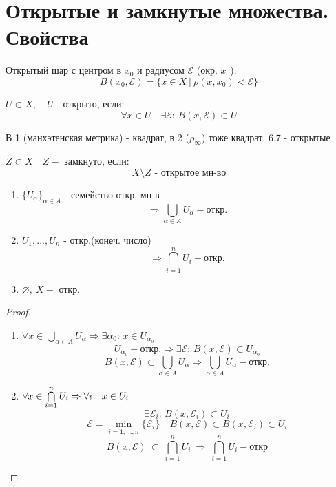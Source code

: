 \documentclass[geometry.tex]{subfiles}
\begin{document}
  \section{Открытые и замкнутые множества. Свойства}

  \begin{definition}
      Открытый шар с центром в $x_0$ и радиусом $\mathcal{E}$ (окр.  $x_0$):
      \[B(x_0, \mathcal{E}) = \{x \in X \ | \ \rho(x, x_0) < \mathcal{E}\}\]
  \end{definition}

  \begin{definition}
      $U \subset X, \quad U$ - открыто, если:
      \[\forall x \in U \quad \exists \mathcal{E}\text{: } B(x, \mathcal{E}) \subset U\]
  \end{definition}

  \begin{example}
      В 1 (манхэтенская метрика) - квадрат, в 2 ($\rho_{\infty}$) тоже квадрат, 6,7 - открытые
  \end{example}

  \begin{definition}
      $Z \subset X \quad Z -$ замкнуто, если:
      \[X \setminus Z \text{ - открытое мн-во}\]
  \end{definition}

  \begin{theorem}[св-ва откр. мн-в]
      \begin{enumerate}
          \item $\{ U_\alpha \}_{\alpha \in A}$ - семейство откр. мн-в
                 \[\Rightarrow \bigcup_{\alpha \in A}U_\alpha - \text{откр.}\]
          \item $U_1,...,U_n$ - откр.(конеч. число) \[\Rightarrow \bigcap_{i = 1}^n U_i - \text{откр.}\]
          \item $\varnothing,\ X - $ откр.
      \end{enumerate}
  \end{theorem}
  \begin{proof}
      \begin{enumerate}
          \item $\forall x \in \bigcup\limits_{\alpha \in A} U_\alpha \Rightarrow \exists \alpha_0\text{: } x \in U_{\alpha_0}$
                 \[U_{\alpha_0} - \text{откр.}\Rightarrow \exists \mathcal{E}\text{: } B(x, \mathcal{E}) \subset U_{\alpha_0}\]
                 \[B(x, \mathcal{E}) \subset \bigcup_{\alpha \in A} U_\alpha \Rightarrow
                 \bigcup_{\alpha \in A} U_\alpha - \text{откр.}\]
          \item $\forall x \in \bigcap\limits_{i = 1}^n U_i \Rightarrow \forall i \quad x \in U_i$
                \[\exists \mathcal{E}_i\text{: } B(x, \mathcal{E}_i) \subset U_i\]
                \[\mathcal{E} = \min_{i = 1,..., n}\{\mathcal{E}_i\} \quad B(x, \mathcal{E}) \subset B(x, \mathcal{E}_i) \subset U_i\]
                \[B(x, \mathcal{E}) \ \subset\  \bigcap\limits_{i=1}^n U_i\  \Rightarrow\  \bigcap\limits_{i = 1} ^ n U_i - \text{откр}\]
      \end{enumerate}
  \end{proof}
\end{document}
